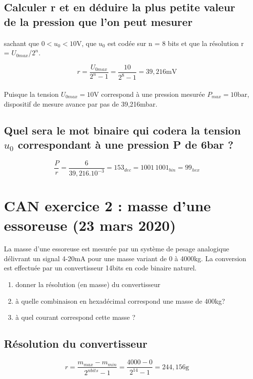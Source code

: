 \documentclass{article}
\begin{document}
\subsection{Calculer r et en déduire la plus petite valeur de la pression que l'on peut mesurer}
\paragraph{}
sachant que $0 < u_0 < 10$V, que $u_0$ est codée sur n = 8 bits et que la résolution r = $U_{0max}$/$2^n$.

$$r = \frac{U_{0max}}{2^n - 1} = \frac{10}{2^8 - 1} = 39,216\si{\milli\volt}$$
\paragraph{}
Puisque la tension $U_{0max} = 10\si{\volt}$ correspond à une pression mesurée $P_{max} = 10\si{\bar}$, dispositif de mesure avance par pas de 39,216\si{\milli\bar}.

\subsection{Quel sera le mot binaire qui codera la tension $u_0$ correspondant à une pression P de 6\si{\bar} ?}
$$\frac{P}{r} = \frac{6}{39,216.10^{-3}} = 153_{dec} = 1001\,1001_{bin} = 99_{hex}$$


\newpage
\section{CAN exercice 2 : masse d'une essoreuse (23 mars 2020)}
\paragraph{}
La masse d'une essoreuse est mesurée par un système de pesage analogique délivrant un signal 4-20\si{\milli\ampere} pour une masse variant de 0 à 4000\si{\kilogram}. La conversion est effectuée par un convertisseur 14bits en code binaire naturel.

\begin{enumerate}
    \item donner la résolution (en masse) du convertisseur
    \item à quelle combinaison en hexadécimal correspond une masse de 400kg?
    \item à quel courant correspond cette masse ?
\end{enumerate}

\subsection{Résolution du convertisseur}
$$r = \frac{m_{max} - m_{min}}{2^{nbits} - 1} = \frac{4000 - 0}{2^{14} - 1} = 244,156\si{\gram}$$
\end{document}
